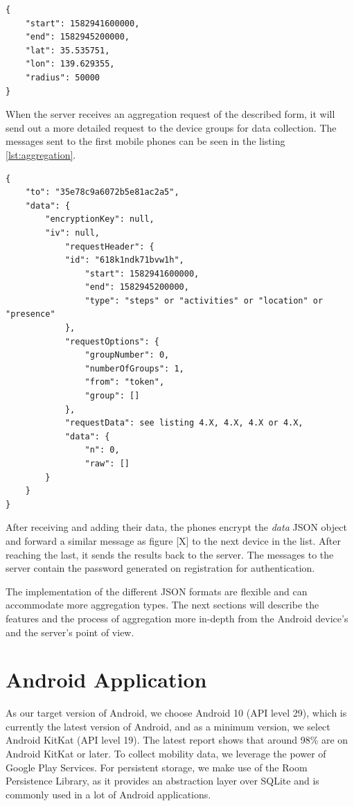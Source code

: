 \begin{lstlisting}[caption=Search options for presence, label={lst:presence}]
{
    "start": 1582941600000,
    "end": 1582945200000,
    "lat": 35.535751,
    "lon": 139.629355,
    "radius": 50000
}
\end{lstlisting}

When the server receives an aggregation request of the described form, it will send out a more detailed request to the device groups for data collection. The messages sent to the first mobile phones can be seen in the listing \ref{lst:aggregation}.

\begin{lstlisting}[caption=First aggregation request sent to the groups, label={lst:aggregation}]
{
	"to": "35e78c9a6072b5e81ac2a5",
	"data": {
		"encryptionKey": null,
		"iv": null,
            "requestHeader": {
			"id": "618k1ndk71bvw1h",
                "start": 1582941600000,
                "end": 1582945200000,
                "type": "steps" or "activities" or "location" or "presence"
            },
            "requestOptions": {
                "groupNumber": 0,
                "numberOfGroups": 1,
                "from": "token",
                "group": []
            },
            "requestData": see listing 4.X, 4.X, 4.X or 4.X,
            "data": {
                "n": 0,
                "raw": []
		}
	}
}
\end{lstlisting}

After receiving and adding their data, the phones encrypt the \textit{data} JSON object and forward a similar message as figure [X] to the next device in the list. After reaching the last, it sends the results back to the server. The messages to the server contain the password generated on registration for authentication.

The implementation of the different JSON formats are flexible and can accommodate more aggregation types. The next sections will describe the features and the process of aggregation more in-depth from the Android device's and the server's point of view.

\section{Android Application}
As our target version of Android, we choose Android 10 (API level 29), which is currently the latest version of Android, and as a minimum version, we select Android KitKat (API level 19). The latest report shows that around 98\% are on Android KitKat or later. To collect mobility data, we leverage the power of Google Play Services. For persistent storage, we make use of the Room Persistence Library, as it provides an abstraction layer over SQLite and is commonly used in a lot of Android applications.

